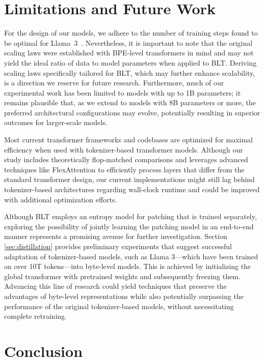 \section{Limitations and Future Work}

For the design of our models, we adhere to the number of training steps found to be optimal for Llama~3~\citep{dubey2024llama}. Nevertheless, it is important to note that the original scaling laws were established with BPE-level transformers in mind and may not yield the ideal ratio of data to model parameters when applied to {\textsc BLT}. Deriving scaling laws specifically tailored for {\textsc BLT}, which may further enhance scalability, is a direction we reserve for future research. Furthermore, much of our experimental work has been limited to models with up to 1B parameters; it remains plausible that, as we extend to models with 8B parameters or more, the preferred architectural configurations may evolve, potentially resulting in superior outcomes for larger-scale models.

Most current transformer frameworks and codebases are optimized for maximal efficiency when used with tokenizer-based transformer models. Although our study includes theoretically flop-matched comparisons and leverages advanced techniques like FlexAttention to efficiently process layers that differ from the standard transformer design, our current implementations might still lag behind tokenizer-based architectures regarding wall-clock runtime and could be improved with additional optimization efforts.

Although {\textsc BLT} employs an entropy model for patching that is trained separately, exploring the possibility of jointly learning the patching model in an end-to-end manner represents a promising avenue for further investigation. Section \ref{sec:distillation} provides preliminary experiments that suggest successful adaptation of tokenizer-based models, such as Llama 3—which have been trained on over 10T tokens—into byte-level models. This is achieved by initializing the global transformer with pretrained weights and subsequently freezing them. Advancing this line of research could yield techniques that preserve the advantages of byte-level representations while also potentially surpassing the performance of the original tokenizer-based models, without necessitating complete retraining.

\section{Conclusion}
\label{section:conclusion}

